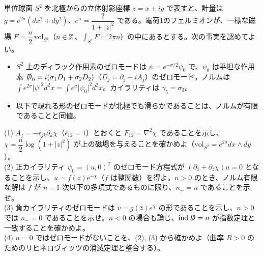 \begin{problem}[難易度 C]\label{ch09-prob-s2}
単位球面 $S^2$ を北極からの立体射影座標 $z=x+iy$ で表すと、計量は $g=e^{2\sigma}(dx^2+dy^2)$、$e^{\sigma}=\dfrac{2}{1+\lvert z\rvert^2}$ である。電荷1のフェルミオンが、一様な磁場 $F=\dfrac n2\,\mathrm{vol}_{S^2}$（$n\in\mathbb{Z}$、$\int_{S^2}F=2\pi n$）の中にあるとする。次の事実を認めてよい。
\begin{itemize}
\item[(i)] $S^2$ 上のディラック作用素のゼロモードは $\psi=e^{-\sigma/2}\psi_0$ で、$\psi_0$ は平坦な作用素 $\slashed D_0=i(\sigma_1D_1+\sigma_2D_2)$（$D_j=\partial_j-iA_j$）のゼロモード。ノルムは $\int e^{2\sigma}\lvert\psi\rvert^2d^2x=\int e^{\sigma}\lvert\psi_0\rvert^2d^2x$。カイラリティは $\gamma_5=\sigma_3$。
\item[(ii)] 以下で現れる形のゼロモードが北極でも滑らかであることは、ノルムが有限であることと同値。
\end{itemize}
(1) $A_j=-\epsilon_{jk}\partial_k\chi$（$\epsilon_{12}=1$）とおくと $F_{12}=\nabla^2\chi$ であることを示し、$\chi=\dfrac n2\log(1+\lvert z\rvert^2)$ が上の磁場を与えることを確かめよ（$\mathrm{vol}_{S^2}=e^{2\sigma}dx\wedge dy$）。\\
(2) 正カイラリティ $\psi_0=(u,0)^T$ のゼロモード方程式が $(\partial_{\bar z}+\partial_{\bar z}\chi)u=0$ となることを示し、$u=f(z)e^{-\chi}$（$f$ は整関数）を得よ。$n>0$ のとき、ノルム有限な解は $f$ が $n-1$ 次以下の多項式であるものに限り、$n_+=n$ であることを示せ。\\
(3) 負カイラリティのゼロモードは $v=g(\bar z)e^{\chi}$ の形であることを示し、$n>0$ では $n_-=0$ であることを示せ。$n<0$ の場合も論じ、$\operatorname{ind}\slashed D=n$ が指数定理と一致することを確かめよ。\\
(4) $n=0$ ではゼロモードがないことを、(2), (3) から確かめよ（曲率 $R>0$ のためのリヒネロヴィッツの消滅定理と整合する）。
\end{problem}


